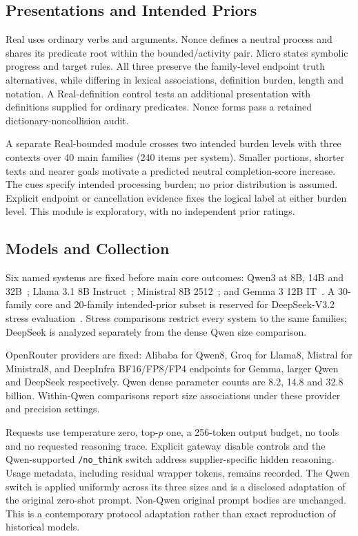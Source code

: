 \documentclass[sigconf,anonymous,review]{acmart}
\begin{document}
\subsection{Presentations and Intended Priors}
Real uses ordinary verbs and arguments. Nonce defines a neutral process and shares its predicate root within the bounded/activity pair. Micro states symbolic progress and target rules. All three preserve the family-level endpoint truth alternatives, while differing in lexical associations, definition burden, length and notation. A Real-definition control tests an additional presentation with definitions supplied for ordinary predicates. Nonce forms pass a retained dictionary-noncollision audit.

A separate Real-bounded module crosses two intended burden levels with three contexts over 40 main families (240 items per system). Smaller portions, shorter texts and nearer goals motivate a predicted neutral completion-score increase. The cues specify intended processing burden; no prior distribution is assumed. Explicit endpoint or cancellation evidence fixes the logical label at either burden level. This module is exploratory, with no independent prior ratings.

\subsection{Models and Collection}
Six named systems are fixed before main core outcomes: Qwen3 at 8B, 14B and 32B~\cite{qwen2025}; Llama 3.1 8B Instruct~\cite{llama2024}; Ministral 8B 2512~\cite{ministral2025}; and Gemma 3 12B IT~\cite{gemma2025}. A 30-family core and 20-family intended-prior subset is reserved for DeepSeek-V3.2 stress evaluation~\cite{deepseek2025}. Stress comparisons restrict every system to the same families; DeepSeek is analyzed separately from the dense Qwen size comparison.

OpenRouter providers are fixed: Alibaba for Qwen8, Groq for Llama8, Mistral for Ministral8, and DeepInfra BF16/FP8/FP4 endpoints for Gemma, larger Qwen and DeepSeek respectively. Qwen dense parameter counts are 8.2, 14.8 and 32.8 billion. Within-Qwen comparisons report size associations under these provider and precision settings.

Requests use temperature zero, top-$p$ one, a 256-token output budget, no tools and no requested reasoning trace. Explicit gateway disable controls and the Qwen-supported \texttt{/no\_think} switch address supplier-specific hidden reasoning. Usage metadata, including residual wrapper tokens, remains recorded. The Qwen switch is applied uniformly across its three sizes and is a disclosed adaptation of the original zero-shot prompt. Non-Qwen original prompt bodies are unchanged. This is a contemporary protocol adaptation rather than exact reproduction of historical models.
\end{document}
